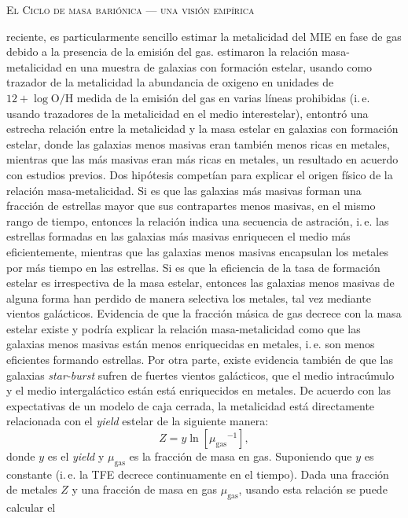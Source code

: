 \documentclass[xcolor=dvipsnames,4pt,hyperref={colorlinks,citecolor=black,linkcolor=black,urlcolor=black}]{beamer}
\begin{document}
\begin{frame}[allowframebreaks]{\textsc{El Ciclo de masa bariónica --- una visión empírica}}
\begin{description}
reciente, es particularmente sencillo estimar la metalicidad del MIE en fase de gas debido a la
presencia de la emisión del gas. \citet{Tremonti2004} estimaron la relación masa-metalicidad en una
muestra de galaxias con formación estelar, usando como trazador de la metalicidad la abundancia de
oxigeno en unidades de $12+\log{\text{O}/\text{H}}$ medida de la emisión del gas en varias líneas
prohibidas (i.\,e. usando trazadores de la metalicidad en el medio interestelar), entontró una
estrecha relación entre la metalicidad y la masa estelar en galaxias con formación estelar, donde
las galaxias menos masivas eran también menos ricas en metales, mientras que las más masivas eran
más ricas en metales, un resultado en acuerdo con estudios previos.
Dos hipótesis competían para explicar el origen físico de la relación masa-metalicidad. Si es que
las galaxias más masivas forman una fracción de estrellas mayor que sus contrapartes menos masivas,
en el mismo rango de tiempo, entonces la relación indica una secuencia de astración, i.\,e. las
estrellas formadas en las galaxias más masivas enriquecen el medio más eficientemente, mientras que
las galaxias menos masivas encapsulan los metales por más tiempo en las estrellas. Si es que la
eficiencia de la tasa de formación estelar es irrespectiva de la masa estelar, entonces las galaxias
menos masivas de alguna forma han perdido de manera selectiva los metales, tal vez mediante vientos
galácticos.
Evidencia de que la fracción másica de gas decrece con la masa estelar existe \citep{Bell2000} y
podría explicar la relación masa-metalicidad como que las galaxias menos masivas están menos
enriquecidas en metales, i.\,e. son menos eficientes formando estrellas. Por otra parte, existe
evidencia también de que las galaxias \emph{star-burst} sufren de fuertes vientos galácticos, que el
medio intracúmulo y el medio intergaláctico están está enriquecidos en metales.
%
De acuerdo con las expectativas de un modelo de caja cerrada, la metalicidad está directamente
relacionada con el \emph{yield} estelar de la siguiente manera:
%
$$
Z = y\ln{\left[{\mu_\text{gas}}^{-1}\right]},
$$
%
donde $y$ es el \emph{yield} y $\mu_\text{gas}$ es la fracción de masa en gas. Suponiendo que $y$ es
constante (i.\,e. la TFE decrece \alert{continuamente} en el tiempo). Dada una fracción de metales
$Z$ y una fracción de masa en gas $\mu_\text{gas}$, usando esta relación se puede calcular el

\end{description}
\end{frame}
\end{document}
